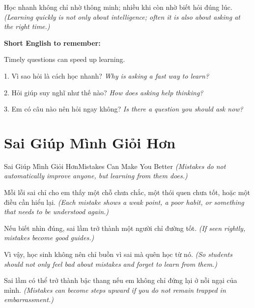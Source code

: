 \begin{baihoc}
Học nhanh không chỉ nhờ thông minh; nhiều khi còn nhờ biết hỏi đúng lúc.
\textit{(Learning quickly is not only about intelligence; often it is also about asking at the right time.)}
\end{baihoc}

\begin{ghinhoanh}
\textbf{Short English to remember:}

Timely questions can speed up learning.

\end{ghinhoanh}

\begin{tuhocnhanh}
1. Vì sao hỏi là cách học nhanh? \textit{Why is asking a fast way to learn?}

2. Hỏi giúp suy nghĩ như thế nào? \textit{How does asking help thinking?}

3. Em có câu nào nên hỏi ngay không? \textit{Is there a question you should ask now?}
\end{tuhocnhanh}
\ngancach

\section{Sai Giúp Mình Giỏi Hơn}
\begin{truyen}{Sai Giúp Mình Giỏi Hơn}{Mistakes Can Make You Better}
\textit{(Mistakes do not automatically improve anyone, but learning from them does.)}

Mỗi lỗi sai chỉ cho em thấy một chỗ chưa chắc, một thói quen chưa tốt, hoặc một điều cần hiểu lại.
\textit{(Each mistake shows a weak point, a poor habit, or something that needs to be understood again.)}

Nếu biết nhìn đúng, sai lầm trở thành một người chỉ đường tốt.
\textit{(If seen rightly, mistakes become good guides.)}

Vì vậy, học sinh không nên chỉ buồn vì sai mà quên học từ nó.
\textit{(So students should not only feel bad about mistakes and forget to learn from them.)}
\end{truyen}

\begin{baihoc}
Sai lầm có thể trở thành bậc thang nếu em không chỉ đứng lại ở nỗi ngại của mình.
\textit{(Mistakes can become steps upward if you do not remain trapped in embarrassment.)}
\end{baihoc}

